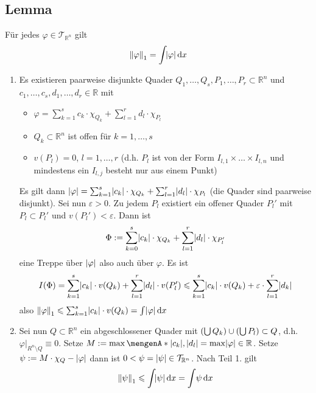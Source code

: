 \subsection[{Lemma: Das Integral einer Treppenfunktion $\varphi$ ist gleich $\norm[1]{\varphi} $}]{Lemma} %
\label{sub:311}
Für jedes $\varphi \in \mathcal{T}_{\mathds{R}^n}$ gilt 
\[
	\norm[1]{\varphi} = \int\! \abs*{\varphi}  \, \mathrm{d}x   
\]
\begin{enumerate}[1.]
	\item Es existieren paarweise disjunkte Quader $Q_1, \ldots , Q_s, P_1, \ldots , P_r \subset \mathds{R}^n$ und $c_1, \ldots , c_s, d_1, \ldots , d_r \in \mathds{R}$
	mit 
	\begin{itemize}
		\item $\varphi = \sum_{k=1}^{s} c_k \cdot \chi_{Q_k} + \sum_{l=1}^{r} d_l \cdot \chi_{P_l}$
		\item $Q_k \subset \mathds{R}^n$ ist offen für $k=1, \ldots , s$
		\item $v(P_l) = 0$, $l=1,\ldots ,r$ (d.h. $P_l$ ist von der Form $I_{l,1} \times \ldots \times I_{l,n}$ 
		 und mindestens ein $I_{l,j}$ besteht nur aus einem Punkt)
	\end{itemize}
	Es gilt dann $\abs*{\varphi} = \sum_{k=1}^{s} \abs*{c_k} \cdot \chi_{Q_k} + \sum_{l=1}^{r} \abs*{d_l} \cdot \chi_{P_l}  $ (die Quader sind paarweise disjunkt). Sei nun
	$\varepsilon>0$. Zu jedem $P_l$ existiert ein offener Quader $P_l'$ mit $P_l \subset P_l'$ und $v(P_l') < \varepsilon$. Dann ist 
	\[
		\Phi := \sum_{k=0}^{s} \abs*{c_k} \cdot \chi_{Q_k} + \sum_{l=1}^{r} \abs*{d_l} \cdot \chi_{P_l'}   
	\]
	eine Treppe über $\abs*{\varphi} $ also auch über $\varphi$. Es ist 
	\[
		I(\Phi) = \sum_{k=1}^{s} \abs*{c_k} \cdot v(Q_k) + \sum_{l=1}^{r} \abs*{d_l} \cdot v(P_l') \le \sum_{k=1}^{s} \abs*{c_k} \cdot v(Q_k) + \varepsilon \cdot 
		\sum_{l=1}^{r} \abs*{d_k}      
	\]
	also $\norm[1]{\varphi}  \le \sum_{k=1}^{s} \abs*{c_k} \cdot v(Q_k) = \int \abs*{\varphi}  \, \mathrm{d}x   $
	\item Sei nun $Q \subset \mathds{R}^n$ ein abgeschlossener Quader mit $\enbrace*{\bigcup Q_k} \cup \enbrace*{\bigcup P_l} \subset Q$, d.h. 
	$\varphi\big|_{R^n \setminus Q} \equiv 0$. Setze $M := \max \set{\abs*{c_k}, \abs*{d_l}  } = \max \abs*{\varphi} \in \mathds{R} $. Setze 
	$\psi := M \cdot \chi_Q - \abs*{\varphi}$ dann ist $0 <\psi = \abs*{\psi} \in \mathcal{T}_{\mathds{R}^n}$. Nach Teil 1. gilt 
	\[
		\norm[1]{\psi} \le \int\! \abs*{\psi}  \, \mathrm{d}x = \int \!\psi  \, \mathrm{d}x   
\]
\end{enumerate}
